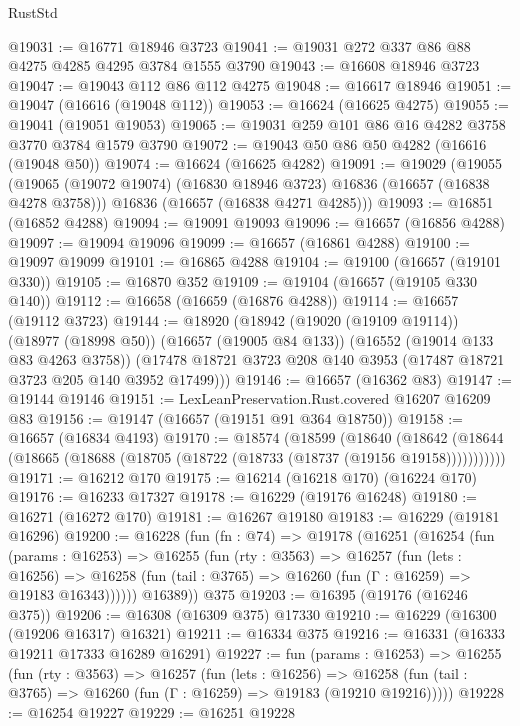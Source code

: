 \begin{lexlean}{RustStd}
\begin{coremodule}
@19031 := @16771 @18946 @3723
@19041 := @19031 @272 @337 @86 @88 @4275 @4285 @4295 @3784 @1555 @3790
@19043 := @16608 @18946 @3723
@19047 := @19043 @112 @86 @112 @4275
@19048 := @16617 @18946
@19051 := @19047 (@16616 (@19048 @112))
@19053 := @16624 (@16625 @4275)
@19055 := @19041 (@19051 @19053)
@19065 := @19031 @259 @101 @86 @16 @4282 @3758 @3770 @3784 @1579 @3790
@19072 := @19043 @50 @86 @50 @4282 (@16616 (@19048 @50))
@19074 := @16624 (@16625 @4282)
@19091 := @19029
    (@19055
      (@19065 (@19072 @19074) (@16830 @18946 @3723) @16836 (@16657 (@16838 @4278 @3758)))
      @16836
      (@16657 (@16838 @4271 @4285)))
@19093 := @16851 (@16852 @4288)
@19094 := @19091 @19093
@19096 := @16657 (@16856 @4288)
@19097 := @19094 @19096
@19099 := @16657 (@16861 @4288)
@19100 := @19097 @19099
@19101 := @16865 @4288
@19104 := @19100 (@16657 (@19101 @330))
@19105 := @16870 @352
@19109 := @19104 (@16657 (@19105 @330 @140))
@19112 := @16658 (@16659 (@16876 @4288))
@19114 := @16657 (@19112 @3723)
@19144 := @18920
    (@18942
      (@19020 (@19109 @19114))
      (@18977 (@18998 @50))
      (@16657 (@19005 @84 @133))
      (@16552 (@19014 @133 @83 @4263 @3758))
      (@17478 @18721 @3723 @208 @140 @3953 (@17487 @18721 @3723 @205 @140 @3952 @17499)))
@19146 := @16657 (@16362 @83)
@19147 := @19144 @19146
@19151 := LexLeanPreservation.Rust.covered @16207 @16209 @83
@19156 := @19147 (@16657 (@19151 @91 @364 @18750))
@19158 := @16657 (@16834 @4193)
@19170 := @18574
    (@18599
      (@18640
        (@18642 (@18644 (@18665 (@18688 (@18705 (@18722 (@18733 (@18737 (@19156 @19158)))))))))))
@19171 := @16212 @170
@19175 := @16214 (@16218 @170) (@16224 @170)
@19176 := @16233 @17327
@19178 := @16229 (@19176 @16248)
@19180 := @16271 (@16272 @170)
@19181 := @16267 @19180
@19183 := @16229 (@19181 @16296)
@19200 := @16228
    (fun (fn : @74) =>
    @19178
      (@16251
        (@16254
          (fun (params : @16253) =>
          @16255
            (fun (rty : @3563) =>
            @16257
              (fun (lets : @16256) =>
              @16258 (fun (tail : @3765) => @16260 (fun (Γ : @16259) => @19183 @16343))))))
        @16389))
    @375
@19203 := @16395 (@19176 (@16246 @375))
@19206 := @16308 (@16309 @375) @17330
@19210 := @16229 (@16300 (@19206 @16317) @16321)
@19211 := @16334 @375
@19216 := @16331 (@16333 @19211 @17333 @16289 @16291)
@19227 := fun (params : @16253) =>
  @16255
    (fun (rty : @3563) =>
    @16257
      (fun (lets : @16256) =>
      @16258 (fun (tail : @3765) => @16260 (fun (Γ : @16259) => @19183 (@19210 @19216)))))
@19228 := @16254 @19227
@19229 := @16251 @19228

\end{coremodule}
\end{lexlean}
